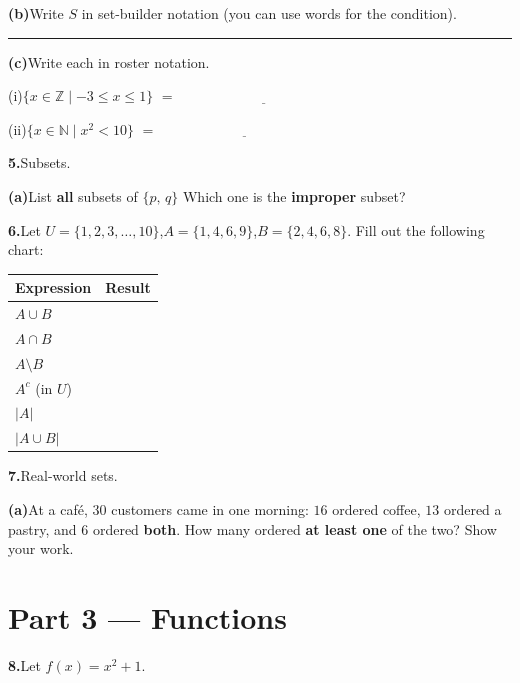 \documentclass[12pt]{article}
\newcommand{\wl}{\par\vspace{5mm}\noindent\rule{\linewidth}{0.4pt}\par\vspace{1mm}}
\begin{document}
\medskip
\textbf{(b)}\quad Write $S$ in set-builder notation (you can use words for the condition).
\wl

\textbf{(c)}\quad Write each in roster notation.
\medskip

\hspace{1.5em}(i)\quad $\{x \in \mathbb{Z} \mid -3 \le x \le 1\}$ $= \;\underline{\hspace{5cm}}$

\medskip
\hspace{1.5em}(ii)\quad $\{x \in \mathbb{N} \mid x^2 < 10\}$ $= \;\underline{\hspace{5cm}}$

\bigskip
\textbf{5.}\quad[4 pts]\quad Subsets.

\medskip
\textbf{(a)}\quad List \textbf{all} subsets of $\{p,\,q\}$ Which one is the \textbf{improper} subset?


\newpage
\bigskip
\textbf{6.}\quad[8 pts]\quad Let $U = \{1,2,3,\ldots,10\}$,\quad $A = \{1,4,6,9\}$,\quad $B = \{2,4,6,8\}$. Fill out the following chart:

\medskip
\renewcommand{\arraystretch}{2.2}
\begin{tabular}{|C{4cm}|C{9cm}|}
\hline
Expression & Result \\
\hline
$A \cup B$ & \\
\hline
$A \cap B$ & \\
\hline
$A \setminus B$ & \\
\hline
$A^c$ (in $U$) & \\
\hline
$|A|$ & \\
\hline
$|A \cup B|$ & \\
\hline
\end{tabular}
\renewcommand{\arraystretch}{1}

\bigskip
\textbf{7.}\quad[4 pts]\quad Real-world sets.
\medskip

\textbf{(a)}\quad At a caf\'e, $30$ customers came in one morning: $16$ ordered coffee, $13$ ordered a pastry, and $6$ ordered \textbf{both}. How many ordered \textbf{at least one} of the two? Show your work.


\newpage
\section*{Part 3 --- Functions}

\medskip
\textbf{8.}\quad[6 pts]\quad Let $f(x) = x^2 + 1$.
\end{document}
